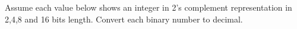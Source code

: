 \documentclass[letterpaper]{exam}
\begin{document}
\begin{questions}
        \question Assume each value below shows an integer in 2's complement representation in 2,4,8 and 16 bits length. Convert each binary number to decimal. 
\end{questions}
\end{document}
